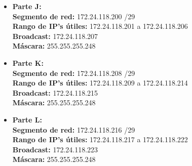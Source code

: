 \begin{itemize}[leftmargin=*]
    \item \textbf{Parte J:} \\
    \textbf{Segmento de red:} 172.24.118.200 /29 \\
    \textbf{Rango de IP's útiles:} 172.24.118.201 a 172.24.118.206 \\
    \textbf{Broadcast:} 172.24.118.207 \\
    \textbf{Máscara:} 255.255.255.248 
    \vspace{5pt}

    \item \textbf{Parte K:} \\
    \textbf{Segmento de red:} 172.24.118.208 /29 \\
    \textbf{Rango de IP's útiles:} 172.24.118.209 a 172.24.118.214 \\
    \textbf{Broadcast:} 172.24.118.215 \\
    \textbf{Máscara:} 255.255.255.248 
    \vspace{5pt}

    \item \textbf{Parte L:} \\
    \textbf{Segmento de red:} 172.24.118.216 /29 \\
    \textbf{Rango de IP's útiles:} 172.24.118.217 a 172.24.118.222 \\
    \textbf{Broadcast:} 172.24.118.223 \\
    \textbf{Máscara:} 255.255.255.248 
\end{itemize}